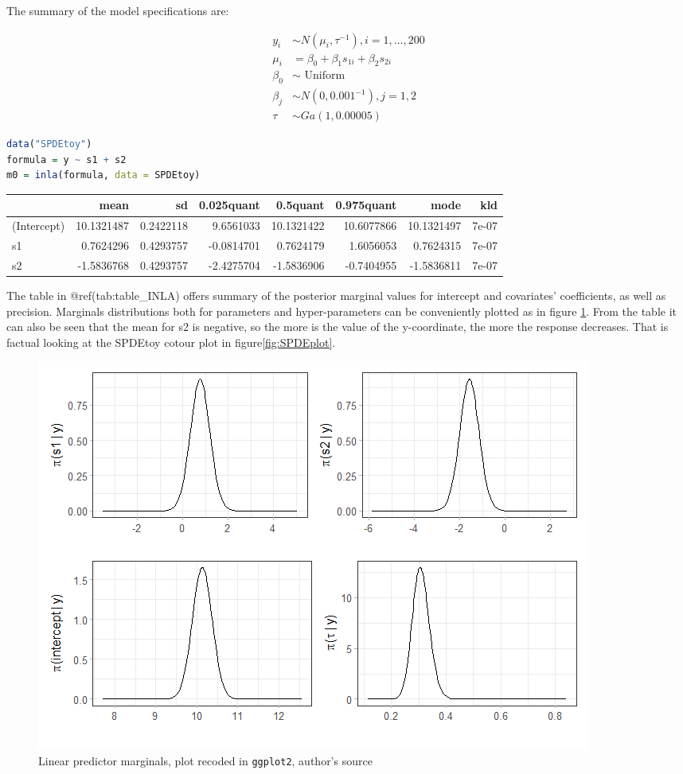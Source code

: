 \documentclass[
  12pt,
  a4paper,
  oneside]{book}
\newcommand{\passthrough}[1]{#1}
\theoremstyle{definition}
\theoremstyle{definition}
\theoremstyle{definition}
\theoremstyle{remark}
\begin{document}
The summary of the model specifications are:

\[
\begin{aligned}
y_{i} & \sim N\left(\mu_{i}, \tau^{-1}\right), i=1, \ldots, 200 \\
\mu_{i} &=\beta_{0}+\beta_{1} s_{1 i}+\beta_{2} s_{2 i} \\
\beta_{0} & \sim \text { Uniform } \\
\beta_{j} & \sim N\left(0,0.001^{-1}\right), j=1,2 \\
\tau & \sim G a(1,0.00005)
\end{aligned}
\]

\begin{lstlisting}[language=R]
data("SPDEtoy")
formula = y ~ s1 + s2
m0 = inla(formula, data = SPDEtoy)
\end{lstlisting}

\begin{tabular}{lrrrrrrr}
\toprule
  & mean & sd & 0.025quant & 0.5quant & 0.975quant & mode & kld\\
\midrule
(Intercept) & 10.1321487 & 0.2422118 & 9.6561033 & 10.1321422 & 10.6077866 & 10.1321497 & 7e-07\\
s1 & 0.7624296 & 0.4293757 & -0.0814701 & 0.7624179 & 1.6056053 & 0.7624315 & 7e-07\\
s2 & -1.5836768 & 0.4293757 & -2.4275704 & -1.5836906 & -0.7404955 & -1.5836811 & 7e-07\\
\bottomrule
\end{tabular}

The table in @ref(tab:table\_INLA) offers summary of the posterior marginal values for intercept and covariates' coefficients, as well as precision. Marginals distributions both for parameters and hyper-parameters can be conveniently plotted as in figure \ref{fig:marginalsplot}. From the table it can also be seen that the mean for s2 is negative, so the more is the value of the y-coordinate, the more the response decreases. That is factual looking at the SPDEtoy cotour plot in figure\ref{fig:SPDEplot}.

\begin{figure}
\centering
\includegraphics{images/marginal_distr.png}
\caption{\label{fig:marginalsplot}Linear predictor marginals, plot recoded in \passthrough{\lstinline!ggplot2!}, author's source}
\end{figure}
\end{document}
